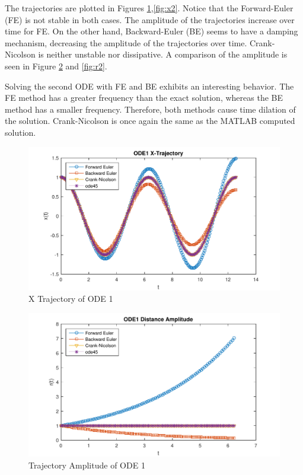 \documentclass[letterpaper,12pt,]{article}
\begin{document}
The trajectories are plotted in Figures \ref{fig:x1},\ref{fig:x2}. Notice that the Forward-Euler (FE) is not stable in both cases. The amplitude of the trajectories increase over time for FE. On the other hand, Backward-Euler (BE) seems to have a damping mechanism, decreasing the amplitude of the trajectories over time. Crank-Nicolson is neither unstable nor dissipative. A comparison of the amplitude is seen in Figure \ref{fig:r1} and \ref{fig:r2}.

Solving the second ODE with FE and BE exhibits an interesting behavior. The FE method has a greater frequency than the exact solution, whereas the BE method has a smaller frequency. Therefore, both methods cause time dilation of the solution. Crank-Nicolson is once again the same as the MATLAB computed solution.


\begin{figure}[h]
    \centering
    \includegraphics[height=0.4\textheight]{XTraj1}
    \caption{X Trajectory of ODE 1}
    \label{fig:x1}
\end{figure}

\begin{figure}
    \centering
    \includegraphics[height=0.4\textheight]{R1}
    \caption{Trajectory Amplitude of ODE 1}
    \label{fig:r1}
\end{figure}
\end{document}
